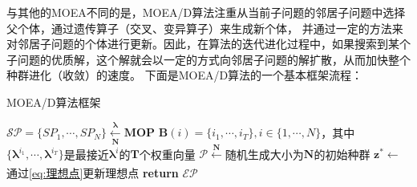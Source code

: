 \par
与其他的MOEA不同的是，MOEA/D算法注重从当前子问题的邻居子问题中选择父个体，通过遗传算子（交叉、变异算子）来生成新个体，
并通过一定的方法来对邻居子问题的个体进行更新。因此，在算法的迭代进化过程中，如果搜索到某个子问题的优质解，这个解就会以一定的方式向邻居子问题的解扩散，从而加快整个种群进化（收敛）的速度。
下面是MOEA/D算法的一个基本框架流程：
\begin{algorithm}[ht]
    \caption{MOEA/D算法框架}
    \label{alg:MOEA/D算法框架}
    \BlankLine
    $\mathcal{SP} = \{ SP_1, \cdots, SP_N \} \xleftarrow[\mathbf{N}]{\boldsymbol{\lambda}} \mathbf{MOP}$ \;
    $\mathbf{B}(i) = \{ i_1, \cdots, i_T \}, i \in \{ 1, \cdots, N \}$，其中$\{ \boldsymbol{\lambda}^{i_1}, \cdots, \boldsymbol{\lambda}^{i_T} \}$是最接近$\boldsymbol{\lambda}^i$的$\mathbf{T}$个权重向量 \;
    $\mathcal{P} \xleftarrow[]{\mathbf{N}} $随机生成大小为$\mathbf{N}$的初始种群 \;
    $\mathbf{z}^* \leftarrow $通过\autoref{eq:理想点}更新理想点 \;
    \textbf{return } $\mathcal{EP}$ \;
\end{algorithm}
